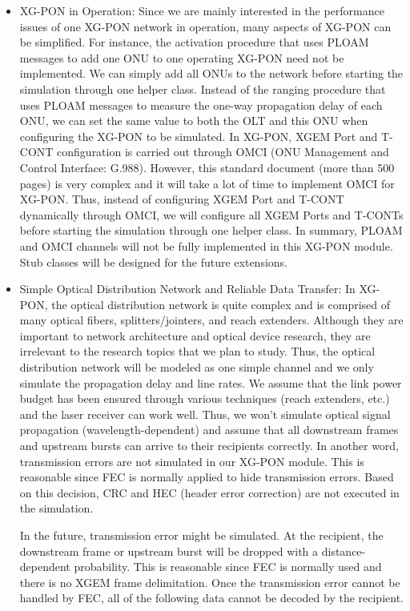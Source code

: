 \begin{itemize}
\item{XG-PON in Operation:} Since we are mainly interested in the performance issues of one XG-PON
network in operation, many aspects of XG-PON can be simplified.
For instance, the activation procedure that uses PLOAM messages to
add one ONU to one operating XG-PON need not be implemented. We
can simply add all ONUs to the network before starting the
simulation through one helper class. Instead of the ranging
procedure that uses PLOAM messages to measure the one-way
propagation delay of each ONU, we can set the same value to both
the OLT and this ONU when configuring the XG-PON to be simulated.
In XG-PON, XGEM Port and T-CONT configuration is carried out
through OMCI (ONU Management and Control Interface: G.988).
However, this standard document (more than 500 pages) is very
complex and it will take a lot of time to implement OMCI for
XG-PON. Thus, instead of configuring XGEM Port and T-CONT
dynamically through OMCI, we will configure all XGEM Ports and
T-CONTs before starting the simulation through one helper class.
In summary, PLOAM and OMCI channels will not be fully implemented
in this XG-PON module. Stub classes will be designed for the
future extensions.


\item{Simple Optical Distribution Network and Reliable Data Transfer:} In XG-PON,
the optical distribution network is quite complex and is comprised
of many optical fibers, splitters/jointers, and reach extenders.
Although they are important to network architecture and optical
device research, they are irrelevant to the research topics that
we plan to study. Thus, the optical distribution network will be
modeled as one simple channel and we only simulate the propagation
delay and line rates. We assume that the link power budget has
been ensured through various techniques (reach extenders, etc.)
and the laser receiver can work well. Thus, we won't simulate
optical signal propagation (wavelength-dependent) and assume that
all downstream frames and upstream bursts can arrive to their
recipients correctly. In another word, transmission errors are not
simulated in our XG-PON module. This is reasonable since FEC is
normally applied to hide transmission errors. Based on this
decision, CRC and HEC (header error correction) are not executed
in the simulation.

In the future, transmission error might be simulated. At the
recipient, the downstream frame or upstream burst will be dropped
with a distance-dependent probability. This is reasonable since
FEC is normally used and there is no XGEM frame delimitation. Once
the transmission error cannot be handled by FEC, all of the
following data cannot be decoded by the recipient.


\end{itemize}
